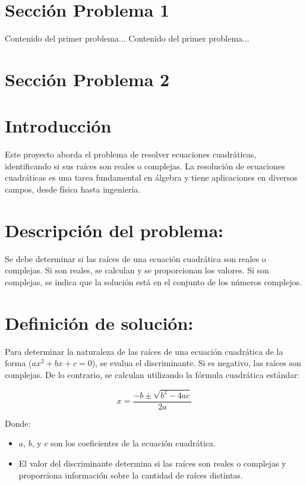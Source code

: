 \documentclass{IEEEcsmag}
\begin{document}
\section{Sección Problema 1}
\newpage
Contenido del primer problema...
\newpage
Contenido del primer problema...





\section{Sección Problema 2}

\section*{Introducción}
Este proyecto aborda el problema de resolver ecuaciones cuadráticas, identificando si sus raíces son reales o complejas. La resolución de ecuaciones cuadráticas es una tarea fundamental en álgebra y tiene aplicaciones en diversos campos, desde física hasta ingeniería.

\section*{Descripción del problema:}
Se debe determinar si las raíces de una ecuación cuadrática son reales o complejas. Si son reales, se calculan y se proporcionan los valores. Si son complejas, se indica que la solución está en el conjunto de los números complejos.


\section*{Definición de solución:}
Para determinar la naturaleza de las raíces de una ecuación cuadrática de la forma  (\(ax^2 + bx + c = 0\)), se evalua el discriminante. Si es negativo, las raíces son complejas. De lo contrario, se calculan utilizando la fórmula cuadrática estándar:

\[ x = \frac{-b \pm \sqrt{b^2 - 4ac}}{2a} \]

Donde:
\begin{itemize}
    \item \(a\), \(b\), y \(c\) son los coeficientes de la ecuación cuadrática.
    \item El valor del discriminante determina si las raíces son reales o complejas y proporciona información sobre la cantidad de raíces distintas.
\end{itemize}
\end{document}
